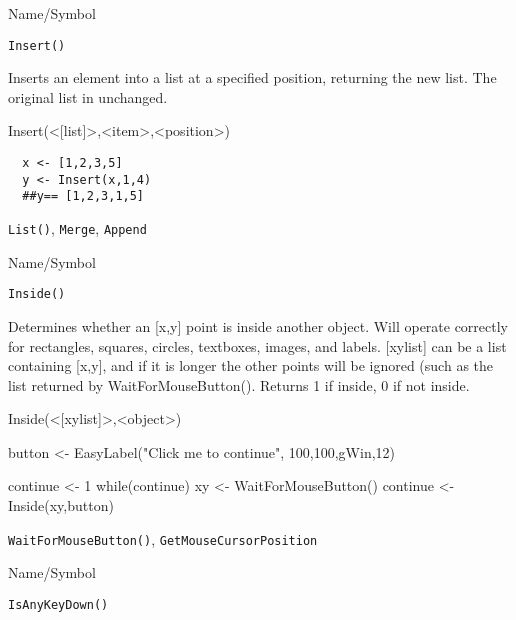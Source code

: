 \begin{desc}{Name/Symbol}
\item[Name/Symbol]	\verb+Insert()+

\item[Description] Inserts an element into a list at a specified
  position, returning the new list. The original list in unchanged.

\item[Usage]	Insert(<[list]>,<item>,<position>)	

\item[Example]	

\begin{verbatim}
  x <- [1,2,3,5]
  y <- Insert(x,1,4)  
  ##y== [1,2,3,1,5]  
\end{verbatim}

\item[See Also]	
\verb+List()+, \verb+Merge+, \verb+Append+

\end{desc}

\rl


\begin{desc}{Name/Symbol}
\item[Name/Symbol]	\verb+Inside()+

\item[Description] Determines whether an [x,y] point is inside another
  object.  Will operate correctly for rectangles, squares, circles,
  textboxes, images, and labels. [xylist] can be a list containing
  [x,y], and if it is longer the other points will be ignored (such as
  the list returned by WaitForMouseButton().  Returns 1 if inside, 0
  if not inside.

\item[Usage]	Inside(<[xylist]>,<object>)	

\item[Example]	


      button <- EasyLabel("Click me to continue", 100,100,gWin,12)

      continue <- 1
      while(continue)
      {
         xy <- WaitForMouseButton()
         continue <- Inside(xy,button)
      }
     

\item[See Also]	
\verb+WaitForMouseButton()+, \verb+GetMouseCursorPosition+

\end{desc}

\rl


\begin{desc}{Name/Symbol}
\item[Name/Symbol]	\verb+IsAnyKeyDown()+

\item[Description]	

\item[Usage]		

\item[Example]	

\item[See Also]	
\end{desc}

